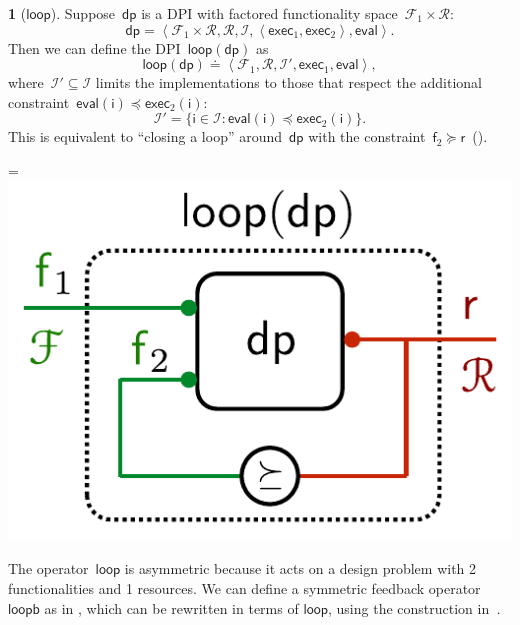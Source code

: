 \documentclass[twocolumn,english]{IEEEtran}
\theoremstyle{definition}
\newtheorem{defn}{\protect\definitionname}
\theoremstyle{plain}
\theoremstyle{definition}
\theoremstyle{remark}
\theoremstyle{definition}
\theoremstyle{plain}
\theoremstyle{plain}
\newcommand{\aword}[1]{\mathsf{#1}}
\newcommand{\vmath}[1]{\aword{#1}}
\newcommand{\posleq}{\preceq}
\newcommand{\posgeq}{\succeq}
\newcommand{\funsp}{\mathscr{F}}
\newcommand{\fun}{\vmath{f}}
\newcommand{\imp}{\vmath{i}}
\newcommand{\impsp}{\mathscr{I}}
\newcommand{\exc}{\vmath{exec}}
\newcommand{\eval}{\vmath{eval}}
\newcommand{\res}{\vmath{r}}
\newcommand{\ressp}{\mathscr{R}}
\newcommand{\dprob}{\vmath{dp}}
\newcommand{\dploop}{\vmath{loop}}
\newcommand{\dploopb}{\vmath{loopb}}
\newcommand*{\vcenteredhbox}[1]{\begingroup
\setbox0=\hbox{#1}\parbox{\wd0}{\box0}\endgroup}
\newcommand{\captionsideleft}[2]{
    \medskip
    \begin{minipage}{1.8cm}{
        \hfill
        \protect\captionof{figure}{#1}}\end{minipage}
    \begin{minipage}{6.6cm}
    
    \vcenteredhbox{{#2}}
    \hfill
    \end{minipage}
    \medskip
}
\providecommand{\definitionname}{Definition}
\begin{document}
\begin{defn}[$\dploop$]
\label{def:dp_loop}Suppose~$\dprob$ is a DPI with factored functionality
space~$\funsp_{1}\times\ressp$: 
\[
\dprob=\left\langle \funsp_{1}\times\ressp,\ressp,\impsp,\left\langle \exc_{1},\exc_{2}\right\rangle ,\eval\right\rangle .
\]
Then we can define the DPI~$\dploop(\dprob)$ as 
\[
\dploop(\dprob)\doteq\left\langle \funsp_{1},\ressp,\impsp',\exc_{1},\eval\right\rangle ,
\]
where~$\impsp'\subseteq\impsp$ limits the implementations to those
that respect the additional constraint~$\eval(\imp)\posleq\exc_{2}(\imp)$:
\[
\impsp'=\{\imp\in\impsp:\eval(\imp)\posleq\exc_{2}(\imp)\}.
\]
This is equivalent to ``closing a loop'' around~$\dprob$ with
the constraint~$\fun_{2}\posgeq\res$~().
\end{defn}
\captionsideleft{\label{fig:sloop}\label{fig:sloop2}}{\includegraphics[scale=0.33]{gmcdp_sloop2}}

The operator~$\dploop$ is asymmetric because it acts on a design
problem with 2 functionalities and 1 resources. We can define a symmetric
feedback operator $\dploopb$ as in , which
can be rewritten in terms of $\dploop$, using the construction in~\emph{.}
\end{document}
